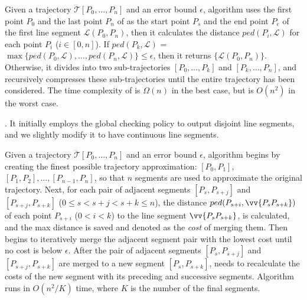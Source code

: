 Given a trajectory $\dddot{\mathcal{T}}[P_0, \ldots, P_n]$ and an error bound $\epsilon$,  algorithm \dpa uses the first point $P_0$ and the last point $P_n$ of  as the start point $P_s$ and the end point $P_e$ of the first line segment $\mathcal{L}(P_0, P_n)$, then it calculates the distance $ped(P_i, {\mathcal{L}})$ for each point $P_i$ ($i\in[0,n]$). If $ped(P_k, {\mathcal{L}})$ = $\max \{ped(P_0, {\mathcal{L}}), \ldots, ped(P_n, {\mathcal{L}}) \} \le \epsilon$, then it returns $\{\mathcal{L}(P_0,P_n)\}$. Otherwise, it divides  into two sub-trajectories $[P_0, \ldots, P_k]$ and $[P_{k}, \ldots, P_n]$, and recursively compresses these sub-trajectories until the entire trajectory has been considered.
%
The time complexity of \dpa is $\Omega(n)$ in the best case, but is $O(n^2)$ in the worst case.





. It initially employs the global checking policy to output disjoint line segments, and we slightly modify it to have continuous line segments.

Given a trajectory $\dddot{\mathcal{T}}[P_0, \ldots, P_n]$ and an error bound $\epsilon$,
algorithm \tpa begins by creating the finest possible  trajectory approximation: $[P_0, P_1]$, $[P_1, P_2], \ldots,[P_{n-1}, P_n]$, so that $n$ segments are used to approximate the original trajectory.
Next, for each pair of adjacent segments $[P_{s}, P_{s+j}]$ and $[P_{s+j}, P_{s+k}]$ ($0\le s<s+j < s+k \le n$),
the  distance $ped(P_{s+i}, \vv{P_sP_{s+k}})$ of each point $P_{s+i}$ ($0<i<k$) to the line segment $\vv{P_sP_{s+k}}$, is calculated, and the max distance is saved and denoted as the \emph{cost} of merging them.
Then \tpa begins to iteratively merge the adjacent segment pair with the lowest cost
until no cost is below $\epsilon$.
After the pair of adjacent segments $[P_{s}, P_{s+j}]$ and $[P_{s+j}, P_{s+k}]$ are merged to a new segment $[P_{s}, P_{s+k}]$, \tpa needs to recalculate the costs of the new segment with its preceding and successive segments.
%
Algorithm \tpa runs in $O(n^2/K)$ time, where $K$ is the number of the final segments.


